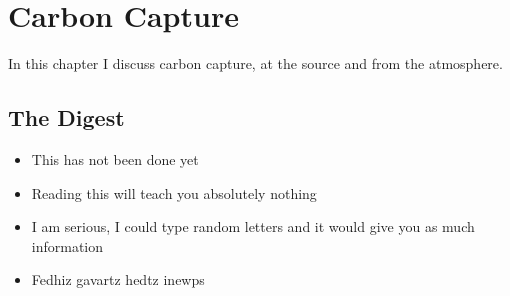 \setchapterpreamble[u]{\margintoc}
\chapter{Carbon Capture}

In this chapter I discuss carbon capture, at the source and from the atmosphere.


\blindtext


\section{The Digest}


\begin{kaoboxgreen}[frametitle=Main Takeaways]

\begin{itemize}
\item This has not been done yet
\item Reading this will teach you absolutely nothing
\item I am serious, I could type random letters and it would give you as much information
\item Fedhiz gavartz hedtz inewps
\end{itemize}
  
\end{kaoboxgreen}